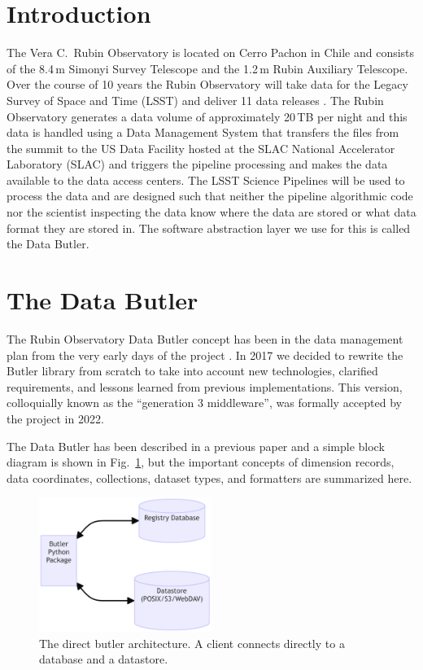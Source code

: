 \section{Introduction}

The Vera C.\ Rubin Observatory is located on Cerro Pachon in Chile and consists of the 8.4\,m Simonyi Survey Telescope and the 1.2\,m Rubin Auxiliary Telescope.
Over the course of 10 years the Rubin Observatory will take data for the Legacy Survey of Space and Time (LSST) and deliver 11 data releases \cite{2019ApJ...873..111I}.
The Rubin Observatory generates a data volume of approximately 20\,TB per night and this data is handled using a Data Management System \cite{2022arXiv221113611O} that transfers the files from the summit to the US Data Facility hosted at the SLAC National Accelerator Laboratory (SLAC) and triggers the pipeline processing and makes the data available to the data access centers.
The LSST Science Pipelines \cite{2019ASPC..523..521B} will be used to process the data and are designed such that neither the pipeline algorithmic code nor the scientist inspecting the data know where the data are stored or what data format they are stored in.
The software abstraction layer we use for this is called the Data Butler. \cite{2019ASPC..523..653J,2022SPIE12189E..11J}

\section{The Data Butler}

The Rubin Observatory Data Butler concept has been in the data management plan from the very early days of the project \cite{2007ASPC..376....3K,2010SPIE.7740E..15A}.
In 2017 \cite{LDM-563} we decided to rewrite the Butler library from scratch to take into account new technologies, clarified requirements, \cite{LDM-556} and lessons learned from previous implementations.
This version, colloquially known as the ``generation 3 middleware'', was formally accepted by the project in 2022. \cite{DMTR-271}

The Data Butler has been described in a previous paper \cite{2022SPIE12189E..11J} and a simple block diagram is shown in Fig.~\ref{fig:direct}, but the important concepts of dimension records, data coordinates, collections, dataset types, and formatters are summarized here.

\begin{figure}
\centering
\includegraphics[width=0.5\textwidth]{butler-direct}
\caption{The direct butler architecture. A client connects directly to a database and a datastore.\label{fig:direct}}
\end{figure}


